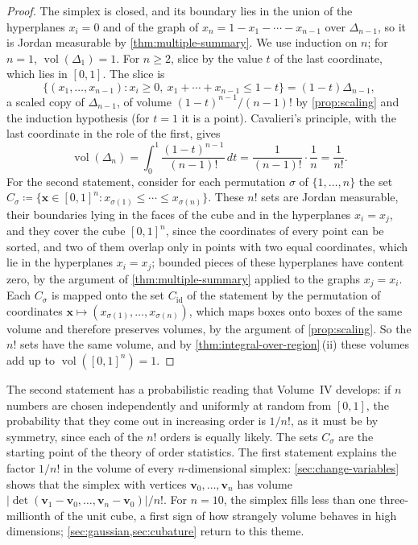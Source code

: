 \begin{proof}
The simplex is closed, and its boundary lies in the union of the hyperplanes $x_i=0$ and of the graph of $x_n=1-x_1-\cdots-x_{n-1}$ over $\Delta_{n-1}$, so it is Jordan measurable by \cref{thm:multiple-summary}. We use induction on $n$; for $n=1$, $\operatorname{vol}(\Delta_1)=1$. For $n\ge2$, slice by the value $t$ of the last coordinate, which lies in $[0,1]$. The slice is
\[
\{(x_1,\ldots,x_{n-1}): x_i\ge0,\ x_1+\cdots+x_{n-1}\le1-t\}=(1-t)\Delta_{n-1},
\]
a scaled copy of $\Delta_{n-1}$, of volume $(1-t)^{n-1}/(n-1)!$ by \cref{prop:scaling} and the induction hypothesis (for $t=1$ it is a point). Cavalieri's principle, with the last coordinate in the role of the first, gives
\[
\operatorname{vol}(\Delta_n)=\int_0^1\frac{(1-t)^{n-1}}{(n-1)!}\,dt=\frac1{(n-1)!}\cdot\frac1n=\frac1{n!} .
\]
For the second statement, consider for each permutation $\sigma$ of $\{1,\ldots,n\}$ the set $C_\sigma\coloneqq\{\mathbf x\in[0,1]^n: x_{\sigma(1)}\le\cdots\le x_{\sigma(n)}\}$. These $n!$ sets are Jordan measurable, their boundaries lying in the faces of the cube and in the hyperplanes $x_i=x_j$, and they cover the cube $[0,1]^n$, since the coordinates of every point can be sorted, and two of them overlap only in points with two equal coordinates, which lie in the hyperplanes $x_i=x_j$; bounded pieces of these hyperplanes have content zero, by the argument of \cref{thm:multiple-summary} applied to the graphs $x_j=x_i$. Each $C_\sigma$ is mapped onto the set $C_{\mathrm{id}}$ of the statement by the permutation of coordinates $\mathbf x\mapsto(x_{\sigma(1)},\ldots,x_{\sigma(n)})$, which maps boxes onto boxes of the same volume and therefore preserves volumes, by the argument of \cref{prop:scaling}. So the $n!$ sets have the same volume, and by \cref{thm:integral-over-region}\,(ii) these volumes add up to $\operatorname{vol}([0,1]^n)=1$.
\end{proof}

The second statement has a probabilistic reading that Volume~IV develops: if $n$ numbers are chosen independently and uniformly at random from $[0,1]$, the probability that they come out in increasing order is $1/n!$, as it must be by symmetry, since each of the $n!$ orders is equally likely. The sets $C_\sigma$ are the starting point of the theory of order statistics. The first statement explains the factor $1/n!$ in the volume of every $n$-dimensional simplex: \cref{sec:change-variables} shows that the simplex with vertices $\mathbf v_0,\ldots,\mathbf v_n$ has volume $|\det(\mathbf v_1-\mathbf v_0,\ldots,\mathbf v_n-\mathbf v_0)|/n!$. For $n=10$, the simplex fills less than one three-millionth of the unit cube, a first sign of how strangely volume behaves in high dimensions; \cref{sec:gaussian,sec:cubature} return to this theme.

